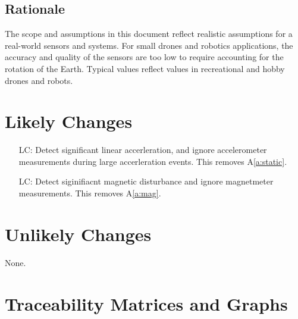 \documentclass[12pt]{article}
\newcommand{\aref}[1]{A\ref{#1}} \newcounter{goalnum} %
\begin{document}
\subsection{Rationale}

The scope and assumptions in this document reflect realistic assumptions for a real-world sensors
and systems. For small drones and robotics applications, the accuracy and quality of the sensors are
too low to require accounting for the rotation of the Earth. Typical values reflect values in
recreational and hobby drones and robots.


\section{Likely Changes} \label{sec:likely_changes}

\begin{itemize}
    \item[LC\refstepcounter{lcnum}\thelcnum\label{lc:acc}:] Detect significant linear accerleration,
    and ignore accelerometer measurements during large accerleration events. This removes
    \aref{a:static}.
    \item[LC\refstepcounter{lcnum}\thelcnum\label{lc:mag}:] Detect siginifiacnt magnetic disturbance
    and ignore magnetmeter measurements. This removes \aref{a:mag}.
\end{itemize}

\section{Unlikely Changes} \label{sec:unlikely_changes}

None.


\section{Traceability Matrices and Graphs} \label{sec:trace}
\end{document}
